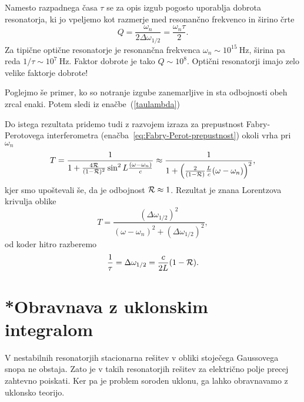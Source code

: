 \begin{remark}
Namesto razpadnega časa $\tau$ se za opis izgub pogosto uporablja
dobrota resonatorja, ki jo vpeljemo kot
razmerje med resonančno frekvenco in širino črte 
\begin{equation}
Q=\frac{\omega_{n}}{2\Delta\omega_{1/2}} = \frac{\omega_{n}\tau}{2}.
\end{equation}
Za tipične optične resonatorje je resonančna 
frekvenca $\omega_n \sim 10^{15}~\si{\hertz}$, širina pa reda 
 $1/\tau \sim 10^{7}~\si{\hertz}$. Faktor dobrote je tako $Q \sim 10^{8}$. Optični 
 resonatorji imajo zelo velike faktorje dobrote!
\end{remark}

Poglejmo še primer, ko so notranje izgube zanemarljive in sta odbojnosti obeh zrcal enaki.
Potem sledi iz enačbe~(\ref{taulambda})

Do istega rezultata pridemo tudi z razvojem izraza za prepustnost Fabry-Perotovega 
interferometra (enačba~\ref{eq:Fabry-Perot-prepustnost})
okoli vrha pri $\omega_{n}$
\begin{equation}
T=\frac{1}{1+\frac{4{\cal R}}{(1-{\cal R})^{2}}\sin^{2}L\frac{(\omega-\omega_{n})}{c}}\approx 
\frac{1}{1+\left(\frac{2}{(1-{\cal R})}\frac{L}{c}(\omega-\omega_{n})\right)^{2}},
\label{3.27}
\end{equation}
 kjer smo upoštevali še, da je odbojnost ${\cal R} \approx 1$. Rezultat je znana Lorentzova
 krivulja oblike
 \begin{equation}
 T = \frac{(\Delta\omega_{1/2})^2}{(\omega - \omega_n)^2+(\Delta\omega_{1/2})^2},
 \label{eq:FBi2}
 \end{equation}
od koder hitro razberemo 
\begin{equation}
\frac{1}{\tau}=\Delta\omega_{1/2} = \frac{c}{2L}(1-{\cal R}).
\end{equation}

\section{*Obravnava z uklonskim integralom}
\label{Resonator_uklon}

V nestabilnih resonatorjih stacionarna rešitev v obliki stoječega
Gaussovega snopa ne obstaja. Zato je v takih resonatorjih rešitev za električno polje precej
zahtevno poiskati. Ker pa je problem soroden uklonu, ga lahko obravnavamo z 
uklonsko teorijo.

